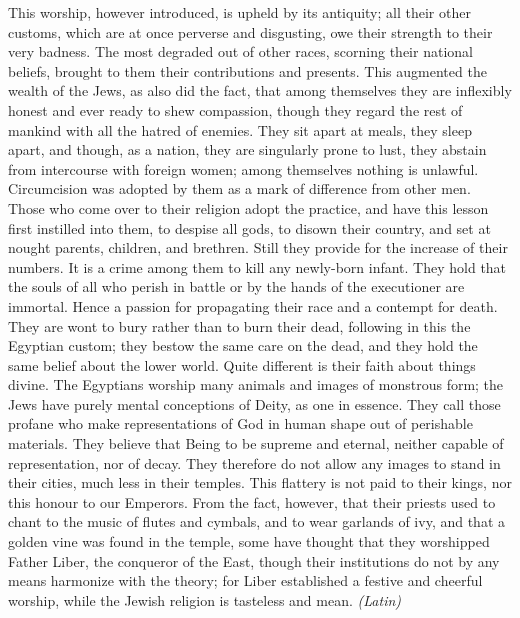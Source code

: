 
This worship, however introduced, is upheld by its antiquity; all their other customs, which are at once perverse and disgusting, owe their strength to their very badness. The most degraded out of other races, scorning their national beliefs, brought to them their contributions and presents. This augmented the wealth of the Jews, as also did the fact, that among themselves they are inflexibly honest and ever ready to shew compassion, though they regard the rest of mankind with all the hatred of enemies. They sit apart at meals, they sleep apart, and though, as a nation, they are singularly prone to lust, they abstain from intercourse with foreign women; among themselves nothing is unlawful. Circumcision was adopted by them as a mark of difference from other men. Those who come over to their religion adopt the practice, and have this lesson first instilled into them, to despise all gods, to disown their country, and set at nought parents, children, and brethren. Still they provide for the increase of their numbers. It is a crime among them to kill any newly-born infant. They hold that the souls of all who perish in battle or by the hands of the executioner are immortal. Hence a passion for propagating their race and a contempt for death. They are wont to bury rather than to burn their dead, following in this the Egyptian custom; they bestow the same care on the dead, and they hold the same belief about the lower world. Quite different is their faith about things divine. The Egyptians worship many animals and images of monstrous form; the Jews have purely mental conceptions of Deity, as one in essence. They call those profane who make representations of God in human shape out of perishable materials. They believe that Being to be supreme and eternal, neither capable of representation, nor of decay. They therefore do not allow any images to stand in their cities, much less in their temples. This flattery is not paid to their kings, nor this honour to our Emperors. From the fact, however, that their priests used to chant to the music of flutes and cymbals, and to wear garlands of ivy, and that a golden vine was found in the temple, some have thought that they worshipped Father Liber, the conqueror of the East, though their institutions do not by any means harmonize with the theory; for Liber established a festive and cheerful worship, while the Jewish religion is tasteless and mean. \emph{(Latin)}


